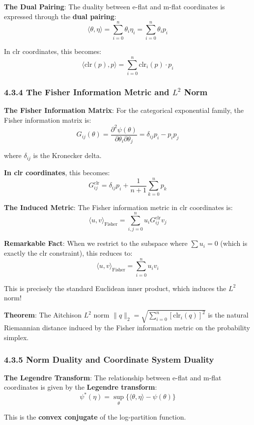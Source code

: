 \documentclass{amsart}
\theoremstyle{plain}
\theoremstyle{definition}
\theoremstyle{remark}
\begin{document}
\textbf{The Dual Pairing}:
The duality between e-flat and m-flat coordinates is expressed through the \textbf{dual pairing}:
\[
\langle \theta, \eta \rangle = \sum_{i=0}^n \theta_i \eta_i = \sum_{i=0}^n \theta_i p_i
\]

In clr coordinates, this becomes:
\[
\langle \text{clr}(p), p \rangle = \sum_{i=0}^n \text{clr}_i(p) \cdot p_i
\]

\subsubsection{4.3.4 The Fisher Information Metric and \texorpdfstring{$L^2$}{L^2} Norm}

\textbf{The Fisher Information Matrix}:
For the categorical exponential family, the Fisher information matrix is:
\[
G_{ij}(\theta) = \frac{\partial^2 \psi(\theta)}{\partial \theta_i \partial \theta_j} = \delta_{ij} p_i - p_i p_j
\]

where $\delta_{ij}$ is the Kronecker delta.

\textbf{In clr coordinates}, this becomes:
\[
G_{ij}^{\text{clr}} = \delta_{ij} p_i + \frac{1}{n+1} \sum_{k=0}^n p_k
\]

\textbf{The Induced Metric}:
The Fisher information metric in clr coordinates is:
\[
\langle u, v \rangle_{\text{Fisher}} = \sum_{i,j=0}^n u_i G_{ij}^{\text{clr}} v_j
\]

\textbf{Remarkable Fact}: When we restrict to the subspace where $\sum u_i = 0$ (which is exactly the clr constraint), this reduces to:
\[
\langle u, v \rangle_{\text{Fisher}} = \sum_{i=0}^n u_i v_i
\]

This is precisely the standard Euclidean inner product, which induces the $L^2$ norm!

\textbf{Theorem}: The Aitchison $L^2$ norm $\|q\|_2 = \sqrt{\sum_{i=0}^n [\text{clr}_i(q)]^2}$ is the natural Riemannian distance induced by the Fisher information metric on the probability simplex.

\subsubsection{4.3.5 Norm Duality and Coordinate System Duality}

\textbf{The Legendre Transform}:
The relationship between e-flat and m-flat coordinates is given by the \textbf{Legendre transform}:
\[
\psi^*(\eta) = \sup_\theta \{\langle \theta, \eta \rangle - \psi(\theta)\}
\]

This is the \textbf{convex conjugate} of the log-partition function.
\end{document}
